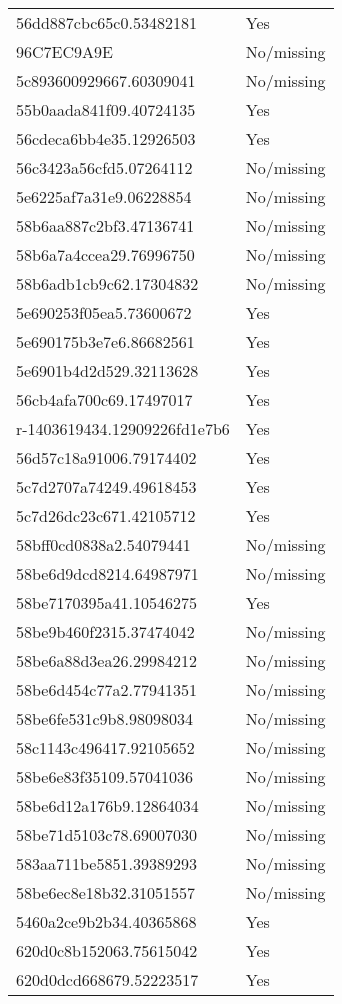 \begin{tabular}{ll}
56dd887cbc65c0.53482181 & Yes \\
96C7EC9A9E & No/missing \\
5c893600929667.60309041 & No/missing \\
55b0aada841f09.40724135 & Yes \\
56cdeca6bb4e35.12926503 & Yes \\
56c3423a56cfd5.07264112 & No/missing \\
5e6225af7a31e9.06228854 & No/missing \\
58b6aa887c2bf3.47136741 & No/missing \\
58b6a7a4ccea29.76996750 & No/missing \\
58b6adb1cb9c62.17304832 & No/missing \\
5e690253f05ea5.73600672 & Yes \\
5e690175b3e7e6.86682561 & Yes \\
5e6901b4d2d529.32113628 & Yes \\
56cb4afa700c69.17497017 & Yes \\
r-1403619434.12909226fd1e7b6 & Yes \\
56d57c18a91006.79174402 & Yes \\
5c7d2707a74249.49618453 & Yes \\
5c7d26dc23c671.42105712 & Yes \\
58bff0cd0838a2.54079441 & No/missing \\
58be6d9dcd8214.64987971 & No/missing \\
58be7170395a41.10546275 & Yes \\
58be9b460f2315.37474042 & No/missing \\
58be6a88d3ea26.29984212 & No/missing \\
58be6d454c77a2.77941351 & No/missing \\
58be6fe531c9b8.98098034 & No/missing \\
58c1143c496417.92105652 & No/missing \\
58be6e83f35109.57041036 & No/missing \\
58be6d12a176b9.12864034 & No/missing \\
58be71d5103c78.69007030 & No/missing \\
583aa711be5851.39389293 & No/missing \\
58be6ec8e18b32.31051557 & No/missing \\
5460a2ce9b2b34.40365868 & Yes \\
620d0c8b152063.75615042 & Yes \\
620d0dcd668679.52223517 & Yes \\

\end{tabular}
